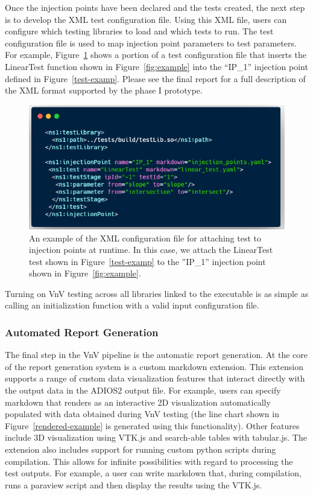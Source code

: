 Once the injection points have been declared and the tests created, the next step is to develop the XML test configuration file. Using this XML file, users can configure which testing libraries to load and which tests to run. The test configuration file is used to map injection point parameters to test parameters. For example, Figure~\ref{test-xml} shows a portion of a test configuration file that inserts the LinearTest function shown in Figure~\ref{fig:example} into the ``IP\_1'' injection point defined in Figure~\ref{test-examp}. Please see the final report for a full description of the XML format supported by the phase I prototype.

\begin{figure}
\centering
 \includegraphics[width=\textwidth]{./narrative/figures/test-xml1.png}
 \caption{An example of the XML configuration file for attaching test to injection points at runtime. In this case, we attach the LinearTest test shown in Figure~\ref{test-examp} to the ''IP\_1''
 injection point shown in Figure~\ref{fig:example}. \label{test-xml}}
\end{figure}

Turning on VnV testing across all libraries linked to the executable is as simple as calling an initialization function with a valid input configuration file.

\subsubsection{Automated Report Generation}

The final step in the VnV pipeline is the automatic report generation. At the core of the report generation system is a custom markdown extension. This extension supports a range of custom data visualization features that interact directly with the output data in the ADIOS2 output file. For example, users can specify markdown that renders as an interactive 2D visualization automatically populated with data obtained during VnV testing (the line chart shown in  Figure~\ref{rendered-example} is generated using this functionality). Other features include 3D visualization using VTK.js and search-able tables with tabular.js. The extension also includes support for running custom python scripts during compilation. This allows for infinite possibilities with regard to processing the test outputs. For example, a user can write markdown that, during compilation, runs a paraview script and then display the results using the VTK.js.   

